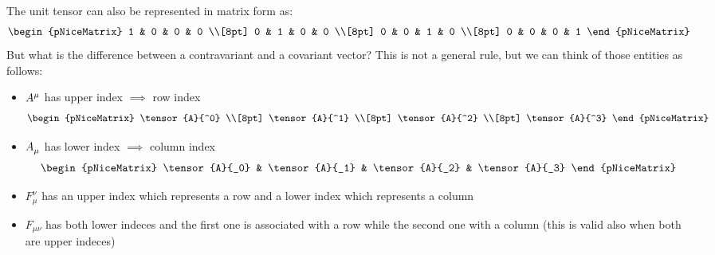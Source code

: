The unit tensor can also be represented in matrix form as:
\begin{equation}
  \begin{pNiceMatrix}
    1 & 0 & 0 & 0 \\[8pt]
    0 & 1 & 0 & 0 \\[8pt]
    0 & 0 & 1 & 0 \\[8pt]
    0 & 0 & 0 & 1
  \end{pNiceMatrix}
\end{equation}
But what is the difference between a contravariant and a covariant vector? This is not a general rule, but we can think of those entities as follows:
\begin{itemize}
  \item $\tensor{A}{^{\mu}}$ has upper index $\implies$ row index \begin{equation}
    \begin{pNiceMatrix}
      \tensor{A}{^0} \\[8pt] \tensor{A}{^1} \\[8pt] \tensor{A}{^2} \\[8pt] \tensor{A}{^3}
    \end{pNiceMatrix}
  \end{equation}
  \item $\tensor{A}{_{\mu}}$ has lower index $\implies$ column index \begin{equation}
    \begin{pNiceMatrix}
      \tensor{A}{_0} & \tensor{A}{_1} & \tensor{A}{_2} & \tensor{A}{_3}
    \end{pNiceMatrix}
  \end{equation}
  \item $F_{\mu}^{\nu}$ has an upper index which represents a row and a lower index which represents a column
  \item $F_{\mu \nu}$ has both lower indeces and the first one is associated with a row while the second one with a column (this is valid also when both are upper indeces)
\end{itemize}
